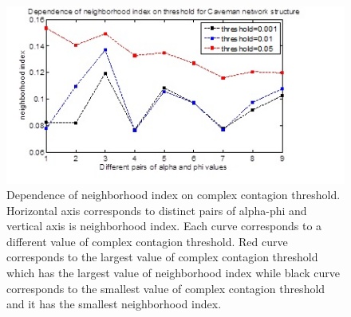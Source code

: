 \documentclass{beamer}
\begin{document}
\begin{frame}
\begin{figure}
[htp]
\begin{center}
\includegraphics{Fig8}
\end{center}
\caption{Dependence of neighborhood index on complex contagion threshold. Horizontal axis corresponds to distinct pairs of alpha-phi and vertical axis is neighborhood index. Each curve corresponds to a different value of complex contagion threshold. Red curve corresponds to the largest value of complex contagion threshold which has the largest value of neighborhood index while black curve corresponds to the smallest value of complex contagion threshold and it has the smallest neighborhood index.}
\label {fig8}
\end{figure}
\end{frame}
%
\end{document}
